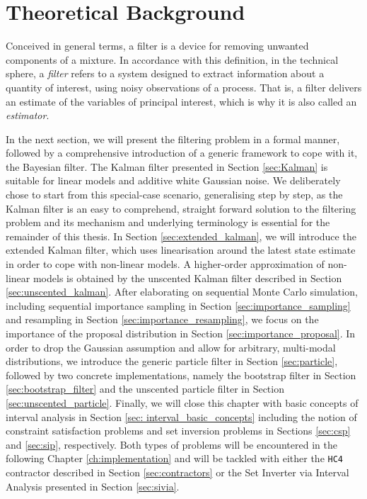 \chapter{Theoretical Background}\label{ch:theoretical_background}

Conceived in general terms, a filter is a device for removing unwanted components of a mixture. In accordance with this definition, in the technical sphere, a \emph{filter} refers to a system designed to extract information about a quantity of interest, using noisy observations of a process. That is, a filter delivers an estimate of the variables of principal interest, which is why it is also called an \emph{estimator}.

In the next section, we will present the filtering problem in a formal manner, followed by a comprehensive introduction of a generic framework to cope with it, the Bayesian filter. The Kalman filter presented in Section \ref{sec:Kalman} is suitable for linear models and additive white Gaussian noise. We deliberately chose to start from this special-case scenario, generalising step by step, as the Kalman filter is an easy to comprehend, straight forward solution to the filtering problem and its mechanism and underlying terminology is essential for the remainder of this thesis. In Section \ref{sec:extended_kalman}, we will introduce the extended Kalman filter, which uses linearisation around the latest state estimate in order to cope with non-linear models. A higher-order approximation of non-linear models is obtained by the unscented Kalman filter described in Section \ref{sec:unscented_kalman}. After elaborating on sequential Monte Carlo simulation, including sequential importance sampling in Section \ref{sec:importance_sampling} and resampling in Section \ref{sec:importance_resampling}, we focus on the importance of the proposal distribution in Section \ref{sec:importance_proposal}. In order to drop the Gaussian assumption and allow for arbitrary, multi-modal distributions, we introduce the generic particle filter in Section \ref{sec:particle}, followed by two concrete implementations, namely the bootstrap filter in Section \ref{sec:bootstrap_filter} and the unscented particle filter in Section \ref{sec:unscented_particle}. Finally, we will close this chapter with basic concepts of interval analysis in Section \ref{sec: interval_basic_concepts} including the notion of constraint satisfaction problems and set inversion problems in Sections \ref{sec:csp} and \ref{sec:sip}, respectively. Both types of problems will be encountered in the following Chapter \ref{ch:implementation} and will be tackled with either the \texttt{HC4} contractor described in Section \ref{sec:contractors} or the Set Inverter via Interval Analysis presented in Section \ref{sec:sivia}.



